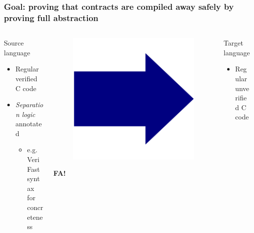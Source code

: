 \documentclass{beamer}
\begin{document}


\begin{frame}
\frametitle{Goal: proving that contracts are compiled away safely by proving full abstraction}
\begin{columns}%
\begin{column}{0.45\textwidth}
	\begin{block}{Source language}
	\begin{itemize}
	\item Regular verified C code
	\item \emph{Separation logic} annotated
		\begin{itemize}
		\item e.g. VeriFast syntax for concreteness
		\end{itemize}
	\end{itemize}
	\end{block}
\end{column}
\begin{column}{0.08\textwidth}
	\begin{figure}
	\includegraphics[width=0.8\linewidth]{BlueArrow}
	\end{figure}\vspace{-2em}
	\center \textbf{FA!}
\end{column}
\begin{column}{0.45\textwidth}
    \begin{block}{Target language}
	\begin{itemize}
	\item Regular unverified C code

\end{itemize}
\end{block}
\end{column}
\end{columns}
\end{frame}
\end{document}

